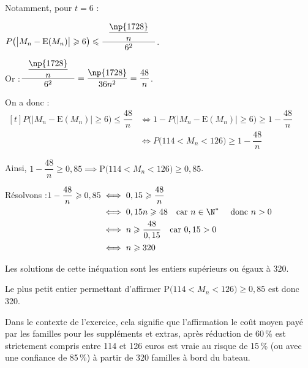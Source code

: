 \begin{enumerate}
\begin{enumerate}
			Notamment, pour $t = 6$ :

			$P\big(\big|M_n - \mathrm{E}(M_n)\big| \geqslant 6\big) \leqslant \dfrac{~~\dfrac{\np{1728}}{n}~~}{6^2}$.

			Or :\quad $\dfrac{~~\dfrac{\np{1728}}{n}~~}{6^2} = \dfrac{\np{1728}}{36n^2} = \dfrac{48}{n}$.

			On a donc :\quad $\begin{aligned}[t]
				P\big(\big|M_n - \mathrm{E}(M_n)\big| \geqslant 6\big) \leqslant \dfrac{48}{n}
					&\iff 1 - P\big(\big|M_n - \mathrm{E}(M_n)\big| \geqslant 6\big) \geqslant 1 - \dfrac{48}{n} \\
					&\iff P\big(114 < M_n < 126\big) \geqslant 1 - \dfrac{48}{n}
			\end{aligned}$

			Ainsi, \quad $1 - \dfrac{48}{n} \geqslant 0,85 \implies \mathrm{P}\big(114<M_{n}<126\big) \geqslant 0,85$.

			Résolvons :\quad $ \begin{aligned}[t]
				1 - \dfrac{48}{n} \geqslant 0,85
					&\iff 0,15 \geqslant \dfrac{48}{n}\\
					&\iff 0,15 n \geqslant 48\quad \text{car } n \in \N^{*} \quad\text{ donc } n>0\\
					&\iff n \geqslant \dfrac{48}{0,15}\quad \text{car } 0,15>0\\
					&\iff n \geqslant 320\\
			\end{aligned}$

			Les solutions de cette inéquation sont les entiers supérieurs ou égaux à 320.

			Le plus petit entier permettant d'affirmer $\mathrm{P}\big(114<M_{n}<126\big) \geqslant 0,85$ est donc 320.

			Dans le contexte de l'exercice, cela signifie que l'affirmation \og le coût moyen payé par les familles pour les suppléments et extras, après réduction de 60\,\% est strictement compris entre 114 et 126 euros\fg{} est vraie au risque de 15\,\% (ou avec une confiance de 85\,\%) à partir de 320 familles à bord du bateau.

		\end{enumerate}
	\end{enumerate}
